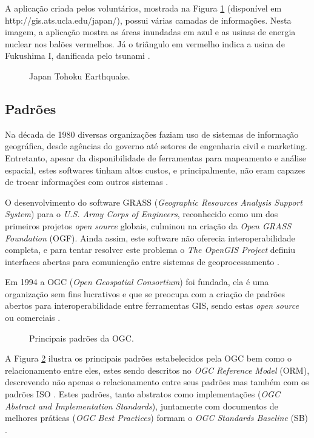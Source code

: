 \documentclass[diss]{template/setrem}
\begin{document}
A aplicação criada pelos voluntários, mostrada na Figura \ref{fig:gis-japan} (disponível em http://gis.ats.ucla.edu/japan/), possui várias camadas de informações. Nesta imagem, a aplicação mostra as áreas inundadas em azul e as usinas de energia nuclear nos balões vermelhos. Já o triângulo em vermelho indica a usina de Fukushima I, danificada pelo tsunami \citep{Folger2011}.

\begin{figure}[!h]
    \caption{Japan Tohoku Earthquake.}
    \label{fig:gis-japan}
\end{figure}

\subsection{Padrões}
\label{subsec:padroes}
Na década de 1980 diversas organizações faziam uso de sistemas de informação geográfica, desde agências do governo até setores de engenharia civil e marketing. Entretanto, apesar da disponibilidade de ferramentas para mapeamento e análise espacial, estes softwares tinham altos custos, e principalmente, não eram capazes de trocar informações com outros sistemas \citep{OGC2012}.

O desenvolvimento do software GRASS (\emph{Geographic Resources Analysis Support System}) para o \emph{U.S. Army Corps of Engineers}, reconhecido como um dos primeiros projetos \emph{open source} globais, culminou na criação da \emph{Open GRASS Foundation} (OGF). Ainda assim, este software não oferecia interoperabilidade completa, e para tentar resolver este problema o \emph{The OpenGIS Project} definiu interfaces abertas para comunicação entre sistemas de geoprocessamento \citep{OGC2012}.

Em 1994 a OGC (\emph{Open Geospatial Consortium}) foi fundada, ela é uma organização sem fins lucrativos e que se preocupa com a criação de padrões abertos para interoperabilidade entre ferramentas GIS, sendo estas \emph{open source} ou comerciais \citep{Michaelis2007}.

\begin{figure}[!h]
    \caption{Principais padrões da OGC.}
    \label{fig:ogc-standards}
\end{figure}

A Figura \ref{fig:ogc-standards} ilustra os principais padrões estabelecidos pela OGC bem como o relacionamento entre eles, estes sendo descritos no \emph{OGC Reference Model} (ORM), descrevendo não apenas o relacionamento entre seus padrões mas também com os padrões ISO \citep{OSGeo2012}. Estes padrões, tanto abstratos como implementações (\emph{OGC Abstract and Implementation Standards}), juntamente com documentos de melhores práticas (\emph{OGC Best Practices}) formam o \emph{OGC Standards Baseline} (SB) \citep{Percivall2011}.
\end{document}
